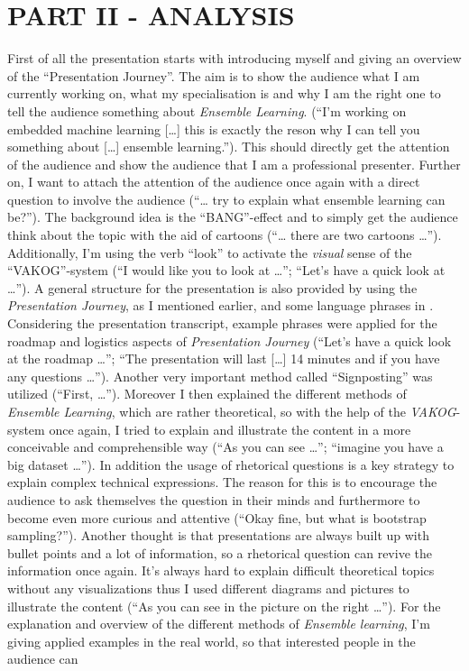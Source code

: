 \section{PART II - ANALYSIS}
First of all the presentation starts with introducing myself and giving an overview of the \enquote{Presentation Journey}\autocite[]{williams2008presentations}. The aim is to show the audience what I am currently working on, what my specialisation is and why I am the right one to tell the audience something about \textit{Ensemble Learning}. (\enquote{I'm working on embedded machine learning [\dots] this is exactly the reson why I can tell you something about [\dots] ensemble learning.}). This should directly get the attention of the audience and show the audience that I am a professional presenter. Further on, I want to attach the attention of the audience once again with a direct question to involve the audience (\enquote{\dots{} try to explain what ensemble learning can be?}). The background idea is the \enquote{BANG}-effect \autocite[]{bomberb} and  to simply get the audience think about the topic with the aid of cartoons (\enquote{\dots{} there are two cartoons \dots}). Additionally, I'm using the verb \enquote{look} to activate the \textit{visual} sense of the \enquote{VAKOG}-system \autocite{JumbuhPrabowo.2015} (\enquote{I would like you to look at \dots}; \enquote{Let's have a quick look at \dots}). A general structure for the presentation is also provided by using the \textit{Presentation Journey}, as I mentioned earlier, and some language phrases in  \autocite[]{emmerson2007business}. Considering the presentation transcript, example phrases were applied for the roadmap and logistics aspects of \textit{Presentation Journey} (\enquote{Let's have a quick look at the roadmap \dots}; \enquote{The presentation will last [\dots] 14 minutes and if you have any questions \dots}). Another very important method called \enquote{Signposting} \autocite{williams2008presentations} was utilized (\enquote{First, \dots}). Moreover I then explained the different methods of \textit{Ensemble Learning}, which are rather theoretical, so with the help of the \textit{VAKOG}-system once again, I tried to explain and illustrate the content in a more conceivable and comprehensible way (\enquote{As you can see \dots}; \enquote{imagine you have a big dataset \dots}). In addition the usage of rhetorical questions is a key strategy to explain complex technical expressions. The reason for this is to encourage the audience to ask themselves the question in their minds and furthermore to become even more curious and attentive (\enquote{Okay fine, but what is bootstrap sampling?}). Another thought is that presentations are always built up with bullet points and a lot of information, so a rhetorical question can revive the information once again. It's always hard to explain difficult theoretical topics without any visualizations thus I used different diagrams and pictures to illustrate the content (\enquote{As you can see in the picture on the right \dots}). For the explanation and overview of the different methods of \textit{Ensemble learning}, I'm giving applied examples in the real world, so that interested people in the audience can 